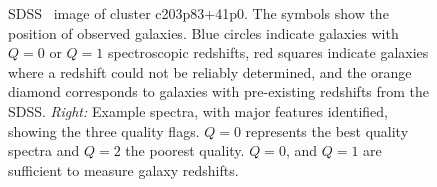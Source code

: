 \begin{figure}
\hfill
{}
    \caption{SDSS \sdssr\ image of cluster c203p83+41p0. The symbols show the position of observed galaxies. Blue circles indicate galaxies with $Q=0$ or $Q=1$ spectroscopic redshifts, red squares indicate galaxies where a redshift could not be reliably determined, and the orange diamond corresponds to galaxies with pre-existing redshifts from the SDSS. \textit{Right:} Example spectra, with major features identified, showing the three quality flags. $Q=0$ represents the best quality spectra and $Q=2$ the poorest quality. $Q=0$, and $Q=1$ are sufficient to measure galaxy redshifts.} 
	\label{fig:c203p83+41p0}
\end{figure}


